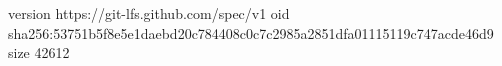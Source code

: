 version https://git-lfs.github.com/spec/v1
oid sha256:53751b5f8e5e1daebd20c784408c0c7c2985a2851dfa01115119c747acde46d9
size 42612
